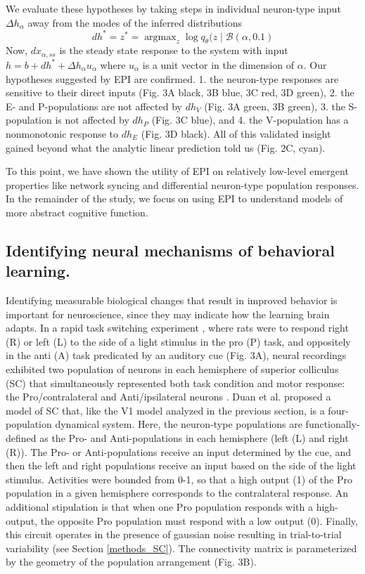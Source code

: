 \documentclass[11pt]{article}
\DeclareMathOperator*{\argmax}{argmax}
\begin{document}
We evaluate these hypotheses by taking steps in individual neuron-type input $\Delta h_\alpha$ away from the modes of the inferred distributions 
\begin{equation}
dh^* = z^* = \argmax_{z} \log q_\theta(z \mid \mathcal{B}(\alpha, 0.1)
\end{equation}
Now, $dx_{\alpha,ss}$ is the steady state response to the system with input $h = b + dh^* + \Delta h_\alpha u_\alpha$ where $u_\alpha$ is a unit vector in the dimension of $\alpha$. Our hypotheses suggested by EPI are confirmed. 1. the neuron-type responses are sensitive to their direct inputs (Fig. 3A black, 3B blue, 3C red, 3D green), 2. the E- and P-populations are not affected by $dh_V$ (Fig. 3A green, 3B green), 3. the S-population is not affected by $dh_P$ (Fig. 3C blue), and 4. the V-population has a nonmonotonic response to $dh_E$ (Fig. 3D black).  All of this validated insight gained beyond what the analytic linear prediction told us (Fig. 2C, cyan).

To this point, we have shown the utility of EPI on relatively low-level emergent properties like network syncing and differential neuron-type population responses.  In the remainder of the study, we focus on using EPI to understand models of more abstract cognitive function.

\subsection{Identifying neural mechanisms of behavioral learning.} \label{results_SC}
Identifying measurable biological changes that result in improved behavior is important for neuroscience, since they may indicate how the learning brain adapts.
In a rapid task switching experiment \cite{duan2015requirement}, where rats were to respond right (R) or left (L) to the side of a light stimulus in the pro (P) task, and oppositely in the anti (A) task predicated by an auditory cue (Fig. 3A), neural recordings exhibited two population of neurons in each hemisphere of superior colliculus (SC) that simultaneously represented both task condition and motor response: the Pro/contralateral and Anti/ipsilateral neurons \cite{duan2018collicular}.  
Duan et al. proposed a model of SC that, like the V1 model analyzed in the previous section, is a four-population dynamical system.  Here, the neuron-type populations are functionally-defined as the Pro- and Anti-populations in each hemisphere (left (L) and right (R)).  The Pro- or Anti-populations receive an input determined by the cue, and then the left and right populations receive an input based on the side of the light stimulus. Activities were bounded from 0-1, so that a high output (1) of the Pro population in a given hemisphere corresponds to the contralateral response.   An additional stipulation is that when one Pro population responds with a high-output, the opposite Pro population must respond with a low output (0).
Finally, this circuit operates in the presence of gaussian noise resulting in trial-to-trial variability (see Section \ref{methods_SC}).
The connectivity matrix is parameterized by the geometry of the population arrangement (Fig. 3B).  
\end{document}
